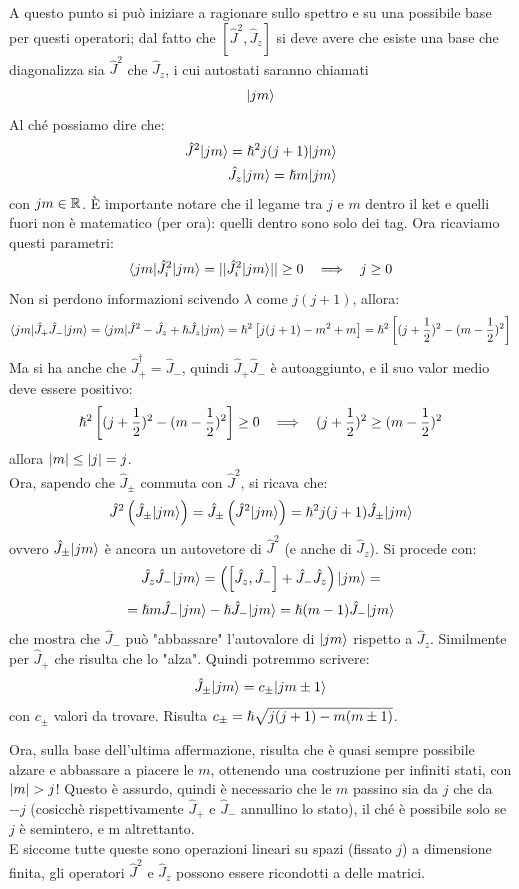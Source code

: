 A questo punto si può iniziare a ragionare sullo spettro e su una possibile base per questi operatori; dal fatto che $[\hat{J}^2, \hat{J}_z]$ si deve avere che esiste una base che diagonalizza sia $\hat{J}^2$ che $\hat{J}_z$, i cui autostati saranno chiamati
\[
	\Ket {jm}
\]
Al ché possiamo dire che:
\begin{align*}
	\hat J^2\Ket {jm} = \h^2j(j+1)\Ket {jm} \\
	\hat J_z\Ket {jm} = \h m\Ket {jm}
\end{align*}
con $jm \in \R$. È importante notare che il legame tra $j$ e $m$ dentro il ket e quelli fuori non è matematico (per ora): quelli dentro sono solo dei tag. Ora ricaviamo questi parametri:
\[
	\lavg[jm]{\hat J^2_i}= \vabs{\hat J_i^2 \Ket {jm}} \geq 0 \ \  \implies \ \  j \geq 0
\]
Non si perdono informazioni scivendo $\lambda$ come $j(j+1)$, allora:
\[
	\lavg[jm]{\hat J_+ \hat J_-} = \lavg[jm]{\hat J^2 - \hat J_z  + \h \hat J_z} = \h^2\left[ j(j+1) - m^2 + m \right] = \h^2 \left[ (j+\half)^2 - (m-\half)^2 \right]
\]
Ma si ha anche che $\hat J_+^\dag = \hat J_-$, quindi $\hat J_+\hat J_-$ è autoaggiunto, e il suo valor medio deve essere positivo:
\[
	\h^2 \left[ (j+\half)^2 - (m-\half)^2 \right] \geq 0 \ \ \implies \ \ (j+\half)^2 \geq (m-\half)^2
\]
allora $\abs{m} \leq \abs{j} = j$. \\
Ora, sapendo che $\hat J_\pm$ commuta con $\hat J^2$, si ricava che:
\[
	\hat J^2 \l\hat J_\pm \Ket {jm}\r = \hat J_\pm \l\hat J^2 \Ket {jm}\r = \h^2j(j+1) \hat J_\pm\Ket {jm}
\]
ovvero $\hat J_\pm\Ket {jm}$ è ancora un autovetore di $\hat J^2$ (e anche di $\hat J_z$). Si procede con:
\[
	\hat J_z \hat J_- \Ket {jm} = \l \comm{\hat J_z}{\hat J_-} + \hat J_- \hat J_z \r\Ket {jm} = \]\[
	= \h m \hat J_- \Ket {jm} - \h \hat J_-\Ket {jm} = \h (m - 1) \hat J_- \Ket {jm}
\]
che mostra che $\hat J_-$ può "abbassare" l'autovalore di $\Ket {jm}$ rispetto a $\hat J_z$. Similmente per $\hat J_+$ che risulta che lo "alza". Quindi potremmo scrivere:
\[
	\hat J_\pm \Ket {jm} = c_\pm \Ket {jm \pm 1}
\]
con $c_\pm$ valori da trovare. Risulta $c_\pm = \h \sqrt{j(j+1) - m(m\pm1)}$.

Ora, sulla base dell'ultima affermazione, risulta che è quasi sempre possibile alzare e abbassare a piacere le $m$, ottenendo una costruzione per infiniti stati, con $\abs m > j$! Questo è assurdo, quindi è necessario che le $m$ passino sia da $j$ che da $-j$ (cosicchè rispettivamente $\hat J_+$ e $\hat J_-$ annullino lo stato), il ché è possibile solo se $j$ è semintero, e m altrettanto. \\
E siccome tutte queste sono operazioni lineari su spazi (fissato $j$) a dimensione finita, gli operatori $\hat J^2$ e $\hat J_z$ possono essere ricondotti a delle matrici.


